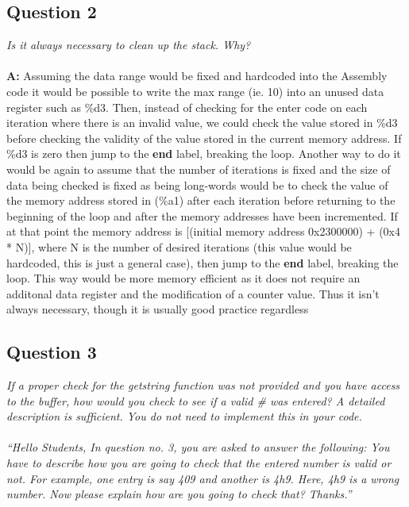 \documentclass[letterpaper]{article}
\begin{document}
    \subsection{Question 2}
      \textit{Is it always necessary to clean up the stack. Why?}
      \\ \\
      \noindent\textbf{A:}
      Assuming the data range would be fixed and hardcoded into the Assembly code it would be possible to
      write the max range (ie. 10) into an unused data register such as \%d3.  Then, instead of checking
      for the enter code on each iteration where there is an invalid value, we could check the value stored in
      \%d3 before checking the validity of the value stored in the current memory address.  If \%d3 is
      zero then jump to the \textbf{end} label, breaking the loop.  Another way to do it would be again
      to assume that the number of iterations is fixed and the size of data being checked is fixed as being
      long-words would be to check the value of the memory address stored in (\%a1) after each iteration
      before returning to the beginning of the loop and after the memory addresses have been incremented.
      If at that point the memory address is [(initial memory address 0x2300000) + (0x4 * N)], where N is
      the number of desired iterations (this value would be hardcoded, this is just a general case), then
      jump to the \textbf{end} label, breaking the loop.  This way would be more memory efficient as it
      does not require an additonal data register and the modification of a counter value.  Thus it isn't always necessary, though it is usually good practice regardless

      \subsection{Question 3} \textit{If a proper check for the getstring
      function was not provided and you have access to the buffer, how would you
      check to see if a valid \# was entered? A detailed description is
      sufficient. You do not need to implement this in your code.
      \\ \\
      ``Hello Students,
		In question no. 3, you are asked to answer the following:
		You have to describe how you are going to check that the entered number is valid or not.
		For example, one entry is say 409 and another is 4h9. Here, 4h9 is a wrong number. Now please explain how are you going to check that?
		Thanks.''}
\end{document}
